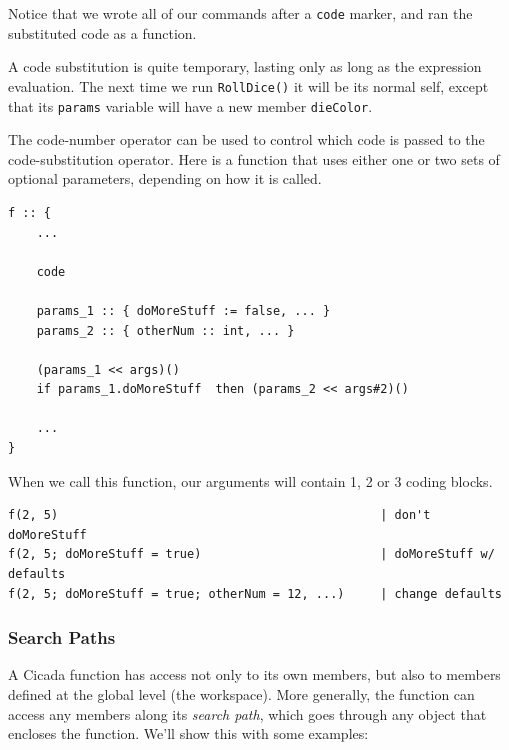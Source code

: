 \documentclass{article}
\newenvironment{code}{
       \begin{list}{}{
               \setlength{\leftmargin}{.4in}
               \setlength{\rightmargin}{0in}
               \setlength{\topsep}{.2in}
       }
       \small
       \item[] }
       { \end{list}   }
\begin{document}
\noindent Notice that we wrote all of our commands after a \texttt{code} marker, and ran the substituted code as a function.

A code substitution is quite temporary, lasting only as long as the expression evaluation.  The next time we run \verb#RollDice()# it will be its normal self, except that its \verb#params# variable will have a new member \verb#dieColor#.

The code-number operator can be used to control which code is passed to the code-substitution operator.  Here is a function that uses either one or two sets of optional parameters, depending on how it is called.

\begin{code} \begin{verbatim}
f :: {
    ...
    
    code
    
    params_1 :: { doMoreStuff := false, ... }
    params_2 :: { otherNum :: int, ... }
    
    (params_1 << args)()
    if params_1.doMoreStuff  then (params_2 << args#2)()
    
    ...
}
\end{verbatim} \end{code}

\noindent When we call this function, our arguments will contain 1, 2 or 3 coding blocks.

\begin{code} \begin{verbatim}
f(2, 5)                                             | don't doMoreStuff
f(2, 5; doMoreStuff = true)                         | doMoreStuff w/ defaults
f(2, 5; doMoreStuff = true; otherNum = 12, ...)     | change defaults
\end{verbatim} \end{code}






\subsubsection{Search Paths} 

A Cicada function has access not only to its own members, but also to members defined at the global level (the workspace).  More generally, the function can access any members along its \emph{search path}, which goes through any object that encloses the function.  We'll show this with some examples:
\end{document}
